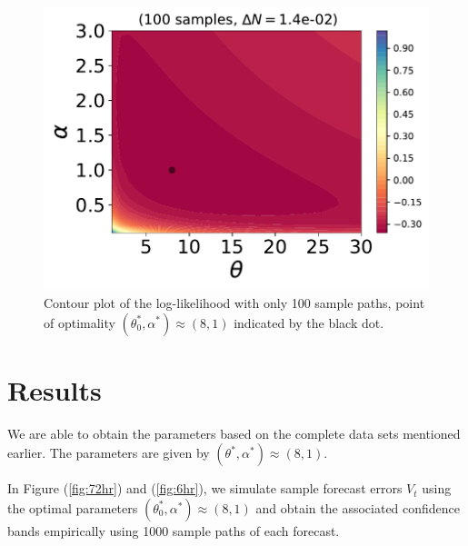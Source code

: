 \documentclass[10pt,twocolumn,letterpaper]{article}
\begin{document}
 \begin{figure}[t]
\begin{center}
   \includegraphics[width=0.9\linewidth]{ISO_100_samples_dN=14e-02.pdf}
\end{center}
   \caption{Contour plot of the log-likelihood with only 100 sample paths, point of optimality $(\theta_0^*, \alpha^*)\approx (8,1)$ indicated by the  black dot.}
\label{contour}
\end{figure} 









\section{Results}
 We are able to obtain the parameters based on the complete data sets mentioned earlier. The parameters are given by $(\theta^*, \alpha^*)\approx (8,1)$.
 
 
 
In Figure (\ref{fig:72hr}) and (\ref{fig:6hr}), we simulate sample forecast errors $V_t$ using the optimal parameters  $(\theta_0^*, \alpha^*)\approx (8,1)$ and obtain the associated confidence bands empirically using 1000 sample paths of each forecast. %
\end{document}
